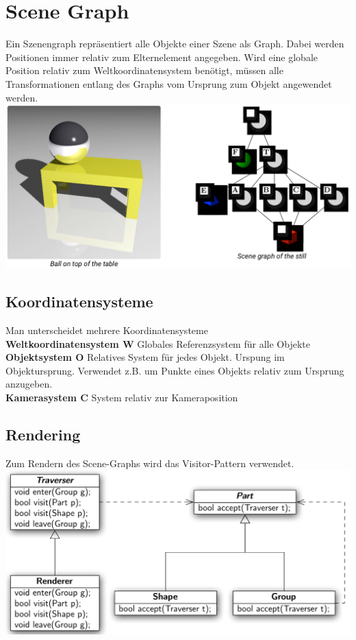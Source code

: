 \documentclass[12pt]{article}
\begin{document}
	\section{Scene Graph}
	Ein Szenengraph repräsentiert alle Objekte einer Szene als Graph. Dabei werden Positionen immer relativ zum Elternelement angegeben. Wird eine globale Position relativ zum Weltkoordinatensystem benötigt, müssen alle Transformationen entlang des Graphs vom Ursprung zum Objekt angewendet werden.\\
	\includegraphics[width=\linewidth]{figures/scene-graph.png}

	\subsection{Koordinatensysteme}
	Man unterscheidet mehrere Koordinatensysteme\\
	\textbf{Weltkoordinatensystem $\mathbf{W}$} Globales Referenzsystem für alle Objekte\\
	\textbf{Objektsystem $\mathbf{O}$} Relatives System für jedes Objekt. Urspung im Objektursprung. Verwendet z.B. um Punkte eines Objekts relativ zum Ursprung anzugeben.\\
	\textbf{Kamerasystem $\mathbf{C}$} System relativ zur Kameraposition

	\subsection{Rendering}
	Zum Rendern des Scene-Graphs wird das Visitor-Pattern verwendet.\\
	\includegraphics[width=\linewidth]{figures/visitor-pattern.png}
\end{document}
